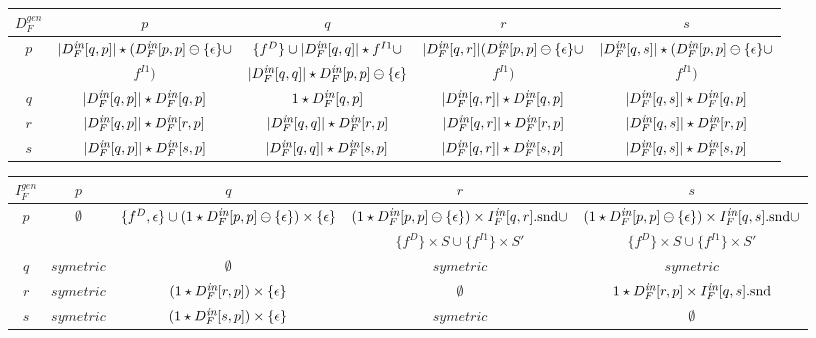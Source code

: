 \documentclass[a4paper]{article}
\newcommand{\p}{\ensuremath{p}}
\newcommand{\q}{\ensuremath{q}}
\newcommand{\s}{\ensuremath{s}}
\newcommand{\myr}{\ensuremath{r}}
\newcommand{\drct}{\ensuremath{D}}
\newcommand{\indrct}{\ensuremath{I}}
\newcommand{\epsilonset}{\ensuremath{\{\epsilon\}}}
\newcommand{\din}{\mbox{\footnotesize\em in}}
\newcommand{\num}[1]{\ensuremath{|#1|}}
\newcommand{\second}[1]{\ensuremath{#1. \mathrm{snd}}}
\newcommand{\remOne}[2]{\ensuremath{#1 \ominus #2}}
\newcommand{\fieldD}[2]{\ensuremath{{#1}_{#2}^\drct}}
\newcommand{\fieldI}[3]{\ensuremath{{#1}_{#2}^{\indrct#3}}}
\begin{document}
\begin{table}
\centering
\scalebox{.8} {
\begin{tabular}{|c|c|c|c|c|}
\hline
$D_F^{gen}$& \p & \q & \myr & \s \\
\hline
\hline
\p & 	$\num{D_F^{\din}[\q, \p]} \star (\remOne{D_F^{\din}[\p, \p]}{\epsilonset} \cup$ & 
		$\{\fieldD{f}{}\} \cup \num{D_F^{\din}[\q,\q]}\star \fieldI{f}{}{1} \cup $ &
		$\num{D_F^{\din}[\q, \myr]}(\remOne{D_F^{\din}[\p, \p]}{\epsilonset} \cup $ & 
		$\num{D_F^{\din}[\q, \s]} \star (\remOne{D_F^{\din}[\p, \p]}{\epsilonset} \cup$ \\ 
   & 	$\fieldI{f}{}{1})$ & $\num{D_F^{\din}[\q,\q]} \star \remOne{D_F^{\din}[\p,\p]}{\epsilonset}$ &  $\fieldI{f}{}{1})$ &  $\fieldI{f}{}{1})$ \\
\hline
\q & $\num{D_F^{\din}[\q, \p]} \star D_F^{\din}[\q, \p]$ & $1 \star D_F^{\din}[\q,\p]$ & $ \num{D_F^{\din}[\q,\myr]} \star D_F^{\din}[\q,\p]$ &  $\num{D_F^{\din}[\q,\s]} \star D_F^{\din}[\q,\p]$ \\
\hline
\myr & $\num{D_F^{\din}[\q, \p]} \star D_F^{\din}[\myr, \p]$ & $\num{D_F^{\din}[\q,\q]} \star D_F^{\din}[\myr,\p]$ & $\num{D_F^{\din}[\q,\myr]} \star D_F^{\din}[\myr,\p]$ &  $\num{D_F^{\din}[\q,\s]} \star D_F^{\din}[\myr,\p]$ \\
\hline
\s & $\num{D_F^{\din}[\q, \p]} \star D_F^{\din}[\s, \p]$ & $\num{D_F^{\din}[\q,\q]} \star D_F^{\din}[\s,\p]$ & $\num{D_F^{\din}[\q,\myr]} \star D_F^{\din}[\s,\p]$ &  $\num{D_F^{\din}[\q,\s]} \star D_F^{\din}[\s,\p]$ \\
\hline
\end{tabular}
}
\scalebox{.8} {
\begin{tabular}{|c|c|c|c|c|}
\hline
$I_F^{gen}$& \p & \q & \myr & \s \\
\hline
\hline
\p & 	$\emptyset$ &
		$\{\fieldD{f}{}, \epsilon\} \cup (1 \star \remOne{D_F^{\din}[\p,\p]}{\epsilonset}) \times \epsilonset$ &
		$(1 \star \remOne{D_F^{\din}[\p,\p]}{\epsilonset}) \times \second{I_F^{\din}[\q,\myr]} \cup$ & 
		$(1 \star \remOne{D_F^{\din}[\p,\p]}{\epsilonset}) \times \second{I_F^{\din}[\q,\s]}   \cup$ \\  
		& & & $\{\fieldD{f}{}\} \times S \cup \{\fieldI{f}{}{1}\} \times S'$ & $\{\fieldD{f}{}\} \times S \cup \{\fieldI{f}{}{1}\} \times S'$ \\
\hline
\q & $symetric$ & $\emptyset$ &  $symetric$ & $symetric$ \\
\hline
\myr & $symetric$ & $(1 \star D_F^{\din}[\myr,\p]) \times \epsilonset$ & $\emptyset$ & $1 \star D_F^{\din}[\myr,\p] \times \second{I_F^{\din}[\q,\s]}$ \\
\hline
\s & $symetric$ & $(1 \star D_F^{\din}[\s,\p]) \times \epsilonset$ & $symetric$ & $\emptyset$ \\
\hline
\end{tabular}
}
\end{table}
\end{document}

